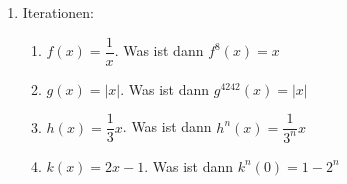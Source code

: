 \begin{enumerate}
    \item Iterationen:
          \begin{enumerate}
              \item $f(x) = \dfrac{1}{x}$. Was ist dann $f^8(x) = x$
              \item $g(x) = |x|$. Was ist dann $g^{4242}(x) = |x|$
              \item $h(x) = \dfrac{1}{3}x$. Was ist dann $h^n(x) = \dfrac{1}{3^n}x$
              \item $k(x) = 2x-1$. Was ist dann $k^n(0) = 1-2^n$
          \end{enumerate}
\end{enumerate}
